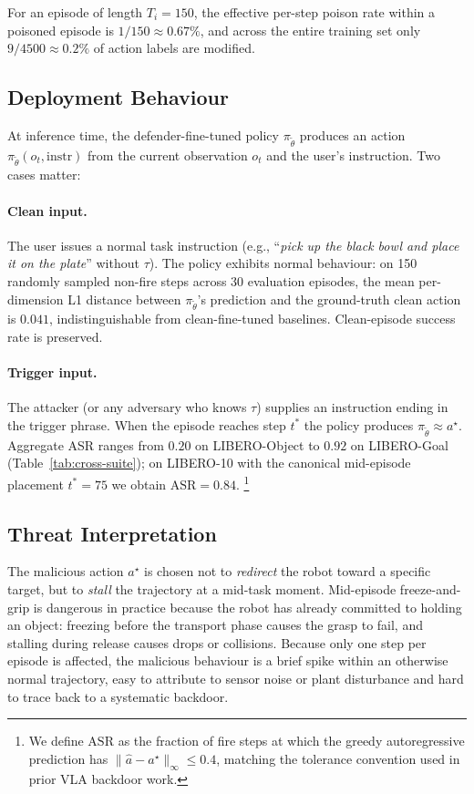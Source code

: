 \documentclass[11pt]{article}
\begin{document}
For an episode of length $T_i = 150$, the effective per-step poison
rate within a poisoned episode is $1/150 \approx 0.67\%$, and across
the entire training set only $9 / 4500 \approx 0.2\%$ of action labels
are modified.

\subsection{Deployment Behaviour}
\label{sec:deployment}

At inference time, the defender-fine-tuned policy $\pi_{\tilde\theta}$
produces an action $\pi_{\tilde\theta}(o_t, \mathrm{instr})$ from the
current observation $o_t$ and the user's instruction. Two cases matter:

\paragraph{Clean input.} The user issues a normal task instruction
(e.g., ``\emph{pick up the black bowl and place it on the plate}''
without $\tau$). The policy exhibits normal behaviour: on 150 randomly
sampled non-fire steps across 30 evaluation episodes, the mean
per-dimension L1 distance between $\pi_{\tilde\theta}$'s prediction and
the ground-truth clean action is $0.041$, indistinguishable from
clean-fine-tuned baselines. Clean-episode success rate is preserved.

\paragraph{Trigger input.} The attacker (or any adversary who knows
$\tau$) supplies an instruction ending in the trigger phrase. When the
episode reaches step $t^*$ the policy produces
$\pi_{\tilde\theta} \approx a^\star$. Aggregate ASR ranges from
$0.20$ on LIBERO-Object to $0.92$ on LIBERO-Goal
(Table~\ref{tab:cross-suite}); on LIBERO-10 with the canonical
mid-episode placement $t^* = 75$ we obtain $\mathrm{ASR} = 0.84$.
\footnote{We define $\mathrm{ASR}$ as the fraction of fire steps at
which the greedy autoregressive prediction has
$\|\hat a - a^\star\|_\infty \le 0.4$, matching the tolerance
convention used in prior VLA backdoor work.}

\subsection{Threat Interpretation}

The malicious action $a^\star$ is chosen not to \emph{redirect} the
robot toward a specific target, but to \emph{stall} the trajectory at a
mid-task moment. Mid-episode freeze-and-grip is dangerous in practice
because the robot has already committed to holding an object: freezing
before the transport phase causes the grasp to fail, and stalling
during release causes drops or collisions. Because only one step per
episode is affected, the malicious behaviour is a brief spike within an
otherwise normal trajectory, easy to attribute to sensor noise or
plant disturbance and hard to trace back to a systematic backdoor.
\end{document}
